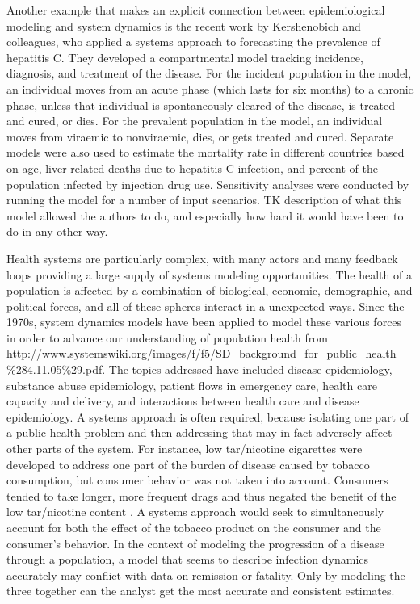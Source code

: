 Another example that makes an explicit connection between
epidemiological modeling and system dynamics is the recent work by
Kershenobich and colleagues, who applied a systems approach to
forecasting the prevalence of hepatitis C. They developed a
compartmental model tracking incidence, diagnosis, and treatment of the
disease. For the incident population in the model, an individual moves
from an acute phase (which lasts for six months) to a chronic phase,
unless that individual is spontaneously cleared of the disease, is
treated and cured, or dies. For the prevalent population in the model,
an individual moves from viraemic to nonviraemic, dies, or gets
treated and cured. Separate models were also used to estimate the
mortality rate in different countries based on age, liver-related
deaths due to hepatitis C infection, and percent of the population
infected by injection drug use. Sensitivity analyses were conducted
by running the model for a number of input scenarios.  TK description
of what this model allowed the authors to do, and especially how hard
it would have been to do in any other way.

Health systems are particularly complex, with many actors and many
feedback loops providing a large supply of systems modeling
opportunities. The health of a population is affected by a combination
of biological, economic, demographic, and political forces, and all of
these spheres interact in a unexpected ways. Since the 1970s, system
dynamics models have been applied to model these various forces in
order to advance our understanding of population health \cite{refs}
from
\url{http://www.systemswiki.org/images/f/f5/SD_background_for_public_health_%284.11.05%29.pdf}. The
  topics addressed have included disease epidemiology, substance
  abuse epidemiology, patient flows in emergency care, health care
  capacity and delivery, and interactions between health care and
  disease epidemiology. A systems approach is often required, because
  isolating one part of a public health problem and then addressing
  that may in fact adversely affect other parts of the system. For
  instance, low tar/nicotine cigarettes were developed to address one
  part of the burden of disease caused by tobacco consumption, but
  consumer behavior was not taken into account. Consumers tended to
  take longer, more frequent drags and thus negated the benefit of the
  low tar/nicotine content \cite{Sterman_Learning_2006}. A systems
  approach would seek to simultaneously account for both the effect of
  the tobacco product on the consumer and the consumer's behavior. In
  the context of modeling the progression of a disease through a
  population, a model that seems to describe infection dynamics
  accurately may conflict with data on remission or fatality. Only by
  modeling the three together can the analyst get the most accurate
  and consistent estimates.

